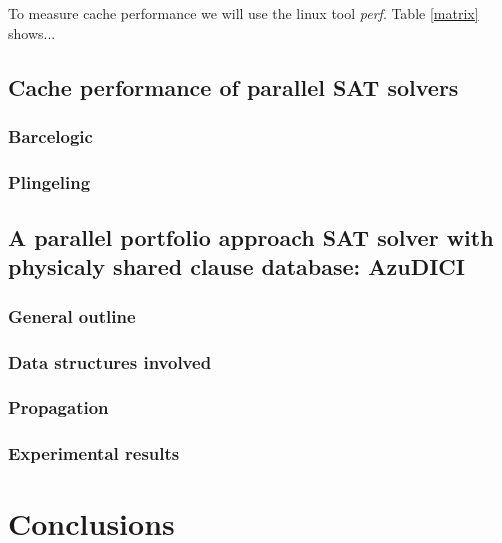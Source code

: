 \documentclass[12pt]{diicc}
\begin{document}
To measure cache performance we will use the linux tool \textit{perf}. Table \ref{matrix} shows...

\section{Cache performance of parallel SAT solvers}

\subsection{Barcelogic}

\subsection{Plingeling}

\section{A parallel portfolio approach SAT solver with physicaly shared clause database: AzuDICI}

\subsection{General outline}

\subsection{Data structures involved}

\subsection{Propagation}

\subsection{Experimental results} 

%
% 
\chapter{Conclusions}\label{chap:conclusion}

%
% 
%


\end{document}
